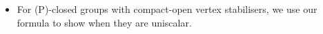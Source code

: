 \documentclass[preview]{standalone}
\begin{document}
\begin{center}
\begin{itemize} \item For (P)-closed groups with compact-open vertex stabilisers, we use our formula to show when they are uniscalar.\end{itemize}
\end{center}
\end{document}
